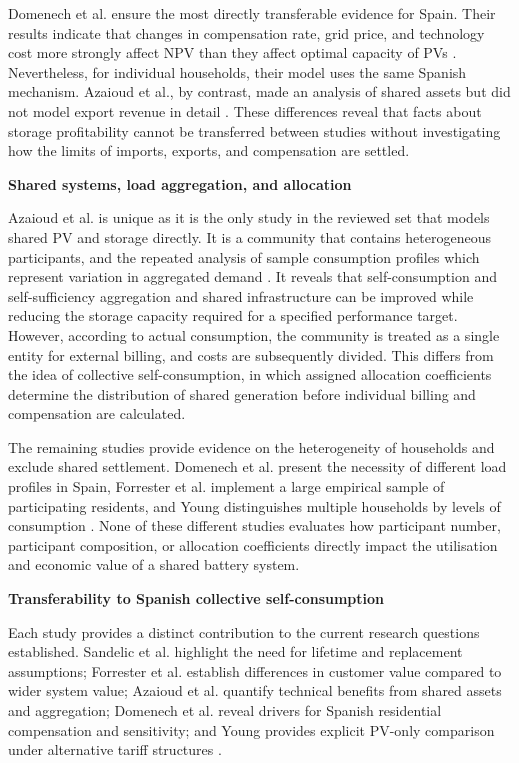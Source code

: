 Domenech et al. ensure the most directly transferable evidence for
Spain. Their results indicate that changes in compensation rate, grid
price, and technology cost more strongly affect NPV than they affect
optimal capacity of PVs \cite{ch2ref062}. Nevertheless, for individual households, their model uses the same Spanish mechanism. Azaioud et al., by
contrast, made an analysis of shared assets but did not model export revenue in
detail \cite{ch2ref051}. These differences reveal that facts about
storage profitability cannot be transferred between studies without
investigating how the limits of imports, exports, and compensation are settled.

\noindent\textbf{Shared systems, load aggregation, and allocation}\par

Azaioud et al. is unique as it is the only study in the reviewed set that models shared PV and storage directly. It is a community that contains heterogeneous
participants, and the repeated analysis of sample consumption profiles which represent variation in aggregated demand \cite{ch2ref051}. It reveals that self-consumption and self-sufficiency aggregation and shared infrastructure can be improved while reducing the storage capacity required for a specified performance target. However, according to actual consumption, the community is treated as a single entity for external billing, and costs are subsequently divided. This differs
from the idea of collective self-consumption, in which assigned allocation
coefficients determine the distribution of shared generation before
individual billing and compensation are calculated.

The remaining studies provide evidence on the heterogeneity of households and exclude shared settlement. Domenech et al. present the necessity of
different load profiles in Spain, Forrester et al. implement a large empirical
sample of participating residents, and Young distinguishes multiple households by
levels of consumption 
\cite{ch2ref031,ch2ref062,ch2ref066}. None of these different studies
evaluates how participant number, participant composition, or allocation
coefficients directly impact the utilisation and economic value of a shared
battery system.

\noindent\textbf{Transferability to Spanish collective self-consumption}\par

Each study provides a distinct contribution to the current research
questions established. Sandelic et al. highlight the need for lifetime and
replacement assumptions; Forrester et al. establish differences in customer value
compared to wider system value; Azaioud et al. quantify technical benefits from
shared assets and aggregation; Domenech et al. reveal drivers for Spanish
residential compensation and sensitivity; and Young provides explicit PV-only comparison under alternative tariff structures
\cite{ch2ref002,ch2ref031,ch2ref051,ch2ref062,ch2ref066}.

